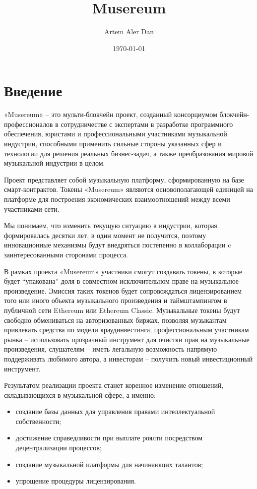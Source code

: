 \documentclass[12pt]{report}
\title{Musereum}
\author{Artem Aler Dan}
\date{\today}
\begin{document}
\maketitle
\pagebreak
\tableofcontents
\pagebreak

\chapter{Введение}
\label{overview}
\begin{multicols}{2}
«Musereum» – это мульти-блокчейн проект, созданный консорциумом блокчейн-профессионалов в сотрудничестве с экспертами в разработке программного обеспечения, юристами и профессиональными участниками музыкальной индустрии, способными применить сильные стороны указанных сфер и технологии для решения реальных бизнес-задач, а также преобразования мировой музыкальной индустрии в целом. 

Проект представляет собой музыкальную платформу, сформированную на базе смарт-контрактов. Токены «Musereum» являются основополагающей единицей на платформе для построения экономических взаимоотношений между всеми участниками сети.

Мы понимаем, что изменить текущую ситуацию в индустрии, которая формировалась десятки лет, в один момент не получится, поэтому инновационные механизмы будут внедряться постепенно в коллаборации c заинтересованными сторонами процесса. 

В рамках проекта «Musereum» участники смогут создавать токены, в которые будет “упакована” доля в совместном исключительном праве на музыкальное произведение. Эмиссия таких токенов будет сопровождаться лицензированием того или иного объекта музыкального произведения и таймштампингом в публичной сети Ethereum или Ethereum Classic. Музыкальные токены будут свободно обмениваться на авторизованных биржах, позволяя музыкантам привлекать средства по модели краудинвестинга, профессиональным участникам рынка – использовать прозрачный инструмент для очистки прав на музыкальные произведения, слушателям – иметь легальную возможность напрямую поддерживать любимого автора, а инвесторам – получить новый инвестиционный инструмент.

Результатом реализации проекта станет коренное изменение отношений, складывающихся в музыкальной сфере, а именно:

\begin{itemize}
	\item создание базы данных для управления правами интеллектуальной собственности;
	\item достижение справедливости при выплате роялти посредством децентрализации процессов;
	\item создание музыкальной платформы для начинающих талантов;
	\item упрощение процедуры лицензирования.
\end{itemize}
\end{multicols}
\end{document}
